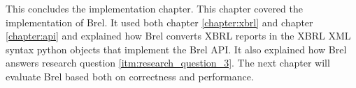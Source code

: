 This concludes the implementation chapter.
This chapter covered the implementation of Brel.
It used both chapter \ref{chapter:xbrl} and chapter \ref{chapter:api} and explained how Brel
converts XBRL reports in the XBRL XML syntax python objects that implement the Brel API.
It also explained how Brel answers research question \ref{itm:research_question_3}.
The next chapter will evaluate Brel based both on correctness and performance.
